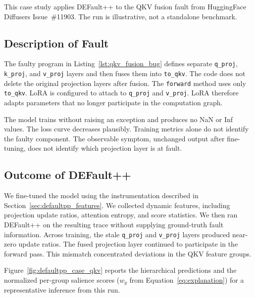 This case study applies DEFault++ to the QKV fusion fault from HuggingFace Diffusers Issue~\#11903. The run is illustrative, not a standalone benchmark.

\subsection{Description of Fault}

The faulty program in Listing~\ref{lst:qkv_fusion_bug} defines separate \texttt{q\_proj}, \texttt{k\_proj}, and \texttt{v\_proj} layers and then fuses them into \texttt{to\_qkv}. The code does not delete the original projection layers after fusion. The \texttt{forward} method uses only \texttt{to\_qkv}. LoRA is configured to attach to \texttt{q\_proj} and \texttt{v\_proj}. LoRA therefore adapts parameters that no longer participate in the computation graph.

The model trains without raising an exception and produces no NaN or Inf values. The loss curve decreases plausibly. Training metrics alone do not identify the faulty component. The observable symptom, unchanged output after fine-tuning, does not identify which projection layer is at fault.

\subsection{Outcome of DEFault++}

We fine-tuned the model using the instrumentation described in Section~\ref{sec:defaultpp_features}. We collected dynamic features, including projection update ratios, attention entropy, and score statistics. We then ran DEFault++ on the resulting trace without supplying ground-truth fault information. Across training, the stale \texttt{q\_proj} and \texttt{v\_proj} layers produced near-zero update ratios. The fused projection layer continued to participate in the forward pass. This mismatch concentrated deviations in the QKV feature groups.

Figure~\ref{fig:defaultpp_case_qkv} reports the hierarchical predictions and the normalized per-group salience scores ($w_g$ from Equation~\ref{eq:explanation}) for a representative inference from this run.

